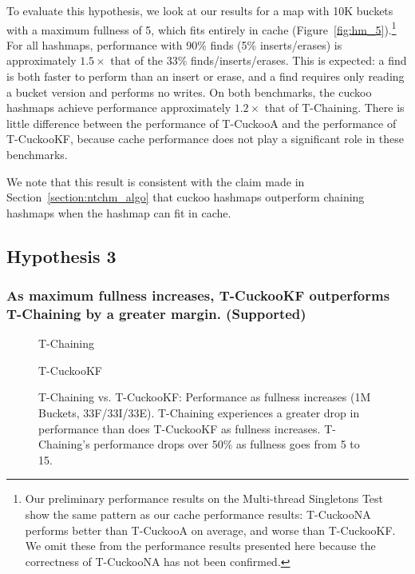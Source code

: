 To evaluate this hypothesis, we look at our results for a map with 10K buckets with a maximum fullness of 5, which fits entirely in cache (Figure~\ref{fig:hm_5}).\footnote{Our preliminary performance results on the Multi-thread Singletons Test show the same pattern as our cache performance results: T-CuckooNA performs better than T-CuckooA on average, and worse than T-CuckooKF. We omit these from the performance results presented here because the correctness of T-CuckooNA has not been confirmed.}
For all hashmaps, performance with 90\% finds (5\% inserts/erases) is approximately $1.5\times$ that of the 33\% finds/inserts/erases. This is expected: a find is both faster to perform than an insert or erase, and a find requires only reading a bucket version and performs no writes. 
On both benchmarks, the cuckoo hashmaps achieve performance approximately $1.2\times$ that of T-Chaining. There is little difference between the performance of T-CuckooA and the performance of T-CuckooKF, because cache performance does not play a significant role in these benchmarks.

We note that this result is consistent with the claim made in Section~\ref{section:ntchm_algo} that cuckoo hashmaps outperform chaining hashmaps when the hashmap can fit in cache. 

\vspace{12pt}
\noindent{}

\subsection{Hypothesis 3}
\subsubsection{As maximum fullness increases, T-CuckooKF outperforms T-Chaining by a greater margin. (Supported)}

\begin{figure}[ht!]
    \centering
    \begin{minipage}{0.7\textwidth}
    \caption*{T-Chaining}
        \vspace{12pt}
    \end{minipage}
    \begin{minipage}{0.7\textwidth}
    \caption*{T-CuckooKF}
    \end{minipage}
    \caption[T-Chaining vs. T-CuckooKF: Performance as fullness increases (1M Buckets, 33F/33I/33E)]{T-Chaining vs. T-CuckooKF: Performance as fullness increases (1M Buckets, 33F/33I/33E). T-Chaining experiences a greater drop in performance than does T-CuckooKF as fullness increases. T-Chaining's performance drops over 50\% as fullness goes from 5 to 15.}
    \label{fig:hm_fullness_33_2}
\end{figure}

